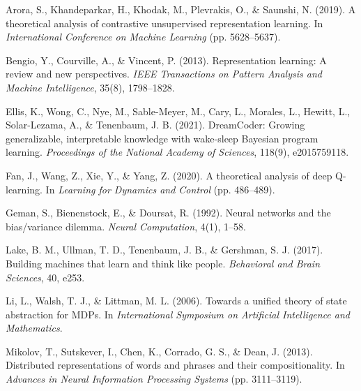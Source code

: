 \documentclass[10pt,journal,compsoc]{IEEEtran}
\begin{document}
\begin{thebibliography}{99}

Arora, S., Khandeparkar, H., Khodak, M., Plevrakis, O., \& Saunshi, N. (2019).
\newblock A theoretical analysis of contrastive unsupervised representation learning.
\newblock In \textit{International Conference on Machine Learning} (pp. 5628--5637).

Bengio, Y., Courville, A., \& Vincent, P. (2013).
\newblock Representation learning: A review and new perspectives.
\newblock \textit{IEEE Transactions on Pattern Analysis and Machine Intelligence}, 35(8), 1798--1828.

Ellis, K., Wong, C., Nye, M., Sable-Meyer, M., Cary, L., Morales, L., Hewitt, L., Solar-Lezama, A., \& Tenenbaum, J. B. (2021).
\newblock DreamCoder: Growing generalizable, interpretable knowledge with wake-sleep Bayesian program learning.
\newblock \textit{Proceedings of the National Academy of Sciences}, 118(9), e2015759118.

Fan, J., Wang, Z., Xie, Y., \& Yang, Z. (2020).
\newblock A theoretical analysis of deep Q-learning.
\newblock In \textit{Learning for Dynamics and Control} (pp. 486--489).

Geman, S., Bienenstock, E., \& Doursat, R. (1992).
\newblock Neural networks and the bias/variance dilemma.
\newblock \textit{Neural Computation}, 4(1), 1--58.

Lake, B. M., Ullman, T. D., Tenenbaum, J. B., \& Gershman, S. J. (2017).
\newblock Building machines that learn and think like people.
\newblock \textit{Behavioral and Brain Sciences}, 40, e253.

Li, L., Walsh, T. J., \& Littman, M. L. (2006).
\newblock Towards a unified theory of state abstraction for MDPs.
\newblock In \textit{International Symposium on Artificial Intelligence and Mathematics}.

Mikolov, T., Sutskever, I., Chen, K., Corrado, G. S., \& Dean, J. (2013).
\newblock Distributed representations of words and phrases and their compositionality.
\newblock In \textit{Advances in Neural Information Processing Systems} (pp. 3111--3119).


\end{thebibliography}
\end{document}
